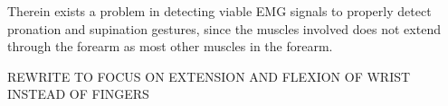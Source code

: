 Therein exists a problem in detecting viable EMG signals to properly detect pronation and supination gestures, since the muscles involved does not extend through the forearm as most other muscles in the forearm. 

REWRITE TO FOCUS ON EXTENSION AND FLEXION OF WRIST INSTEAD OF FINGERS

%
%



